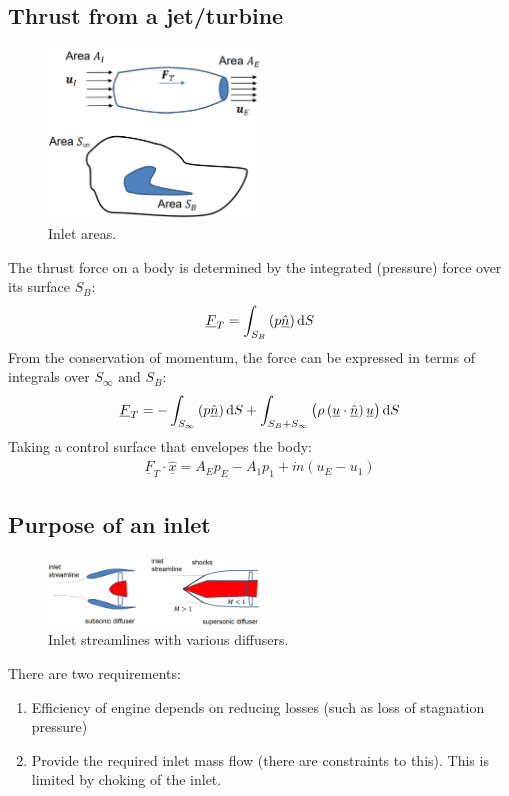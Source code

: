 \subsection{Thrust from a jet/turbine}
\begin{figure}[H]
    \centering
    \includegraphics[width = 0.5\textwidth]{./img/diagram38.png}
    \caption{Inlet areas.}
\end{figure}
The thrust force on a body is determined by the integrated (pressure) force over its surface $S_B$:
\begin{gather}
    \underline{F}_T = \int_{S_{B}}\left(p\underline{\hat{n}}\right)\dif S
\end{gather}
From the conservation of momentum, the force can be expressed in terms of integrals over $S_{\infty}$ and $S_B$:
\begin{gather}
    \underline{F}_T = - \int_{S_{\infty}}\left(p \underline{\hat{n}}\right)\dif S + \int_{S_B + S_{\infty}}\left(\rho\left(\underline{u}\cdot\underline{\hat{n}}\right)\underline{u}\right)\dif S
\end{gather}
Taking a control surface that envelopes the body:
\begin{gather}
    \underline{F}_T \cdot \underline{\hat{x}} = A_Ep_E - A_1 p_1 + \dot{m} \left(u_E - u_1\right)
\end{gather}
\subsection{Purpose of an inlet}
\begin{figure}[H]
    \centering
    \includegraphics[width = 0.5\textwidth]{./img/diagram39.png}
    \caption{Inlet streamlines with various diffusers.}
\end{figure}
There are two requirements:
\begin{enumerate}
    \item Efficiency of engine depends on reducing losses (such as loss of stagnation pressure)
    \item Provide the required inlet mass flow (there are constraints to this). This is limited by choking of the inlet.
\end{enumerate}
